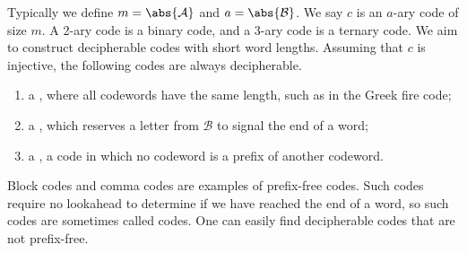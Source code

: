 Typically we define $m = \abs{\mathcal A}$ and $a = \abs{\mathcal B}$.
We say $c$ is an $a$-ary code of size $m$.
A 2-ary code is a binary code, and a 3-ary code is a ternary code.
We aim to construct decipherable codes with short word lengths.
Assuming that $c$ is injective, the following codes are always decipherable.
\begin{enumerate}
    \item a , where all codewords have the same length, such as in the Greek fire code;
    \item a , which reserves a letter from $\mathcal B$ to signal the end of a word;
    \item a , a code in which no codeword is a prefix of another codeword.
\end{enumerate}
Block codes and comma codes are examples of prefix-free codes.
Such codes require no lookahead to determine if we have reached the end of a word, so such codes are sometimes called  codes.
One can easily find decipherable codes that are not prefix-free.

